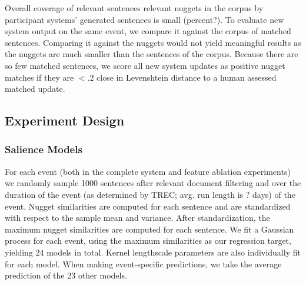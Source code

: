 Overall coverage of
relevant sentences
relevant nuggets in the corpus  by participant systems' generated sentences
is small (percent?).
To evaluate new system output on the same event, we compare it against the
corpus of matched sentences. Comparing it against the nuggets would not yield
meaningful results as the nuggets are much smaller than the sentences of the
corpus.
Because there are so few matched sentences, we score all new system updates as positive
nugget matches if they are $< .2$ close in Levenshtein distance to a human
assessed matched update. 

\subsection{Experiment Design}

\subsubsection{Salience Models}
For each event (both in the complete system and feature ablation experiments)
we randomly sample 1000 sentences after relevant document filtering and 
over the duration of the event 
(as determined by 
TREC; avg. run length is ? days) of the event. Nugget similarities
are computed for each sentence and are standardized with respect to 
the sample mean and variance. After standardization, the maximum nugget similarities are computed for each sentence. 
We fit a Gaussian process for each event, using the maximum similarities 
as our regression target, yielding 24 models in total. Kernel lengthscale
parameters are also individually fit for each model.
When making event-specific predictions, we take the average prediction of the
23 other models.

